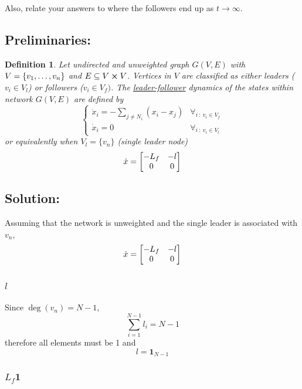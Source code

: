 \documentclass[]{article}
\numberwithin{equation}{section}
\newcommand{\st}{\ : \ }
\newtheorem{definition}{Definition}
\begin{document}
Also, relate your answers to where the followers end up as $t \to \infty$.

\subsection*{Preliminaries:}
\begin{definition}\label{def:leader_follower_dynamics}
    Let undirected and unweighted graph $G(V,E)$ with $V = \qty{v_1,\dots,v_n}$ and $E \subseteq V \cross V$.
    Vertices in $V$ are classified as either \emph{leaders} ($v_i \in V_l$) or \emph{followers} ($v_i \in V_f)$. 
	The \emph{\underline{leader-follower}} dynamics of the states within network $G(V,E)$ are defined by\[\begin{cases}
        \dot{x}_i = - \sum_{j \neq N_i} (x_i - x_j) &\forall_{i \st v_i \in V_{f}}\\
        \dot{x}_i =  0 &\forall_{i \st v_i \in V_{l}}
    \end{cases}
	\] or equivalently when $V_{l} = \{v_n\}$ (single leader node) \[
        \dot{x} = \mqty[
            -L_f & - l\\
            0 & 0
        ]
    \]
\end{definition}

\subsection*{Solution:}
Assuming that the network is unweighted and the single leader is associated with $v_n$,\[
    \dot{x} = \mqty[
        -L_f & - l\\
        0 & 0
    ]
\]
\subsubsection{$l$}
Since $\deg(v_n) = N-1$, \[
    \sum_{i=1}^{N-1} l_i = N-1
\] therefore all elements must be 1 and \[
    l = \mathbf{1}_{N-1}
\]

\subsubsection{$L_f \mathbf{1}$}
\end{document}

